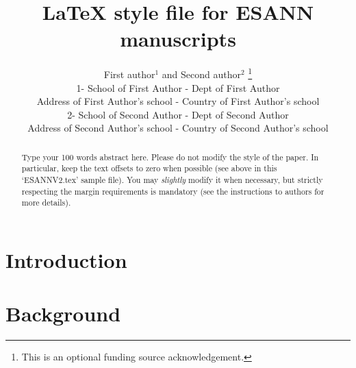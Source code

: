 \documentclass{style/esannV2}
\begin{document}
\title{LaTeX style file for ESANN manuscripts}

\author{First author$^1$ and Second author$^2$
%
\thanks{This is an optional funding source acknowledgement.}
%
\vspace{.3cm}\\
%
1- School of First Author - Dept of First Author \\
Address of First Author's school - Country of First Author's
school
%
\vspace{.1cm}\\
2- School of Second Author - Dept of Second Author \\
Address of Second Author's school - Country of Second Author's school\\
}

\maketitle

\begin{abstract}
Type your 100 words abstract here. Please do not modify the style
of the paper. In particular, keep the text offsets to zero when
possible (see above in this `ESANNV2.tex' sample file). You may
\emph{slightly} modify it when necessary, but strictly respecting
the margin requirements is mandatory (see the instructions to
authors for more details).
\end{abstract}

\section{Introduction}



\section{Background}
\end{document}
